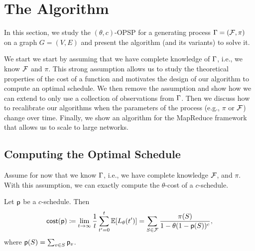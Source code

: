 \section{The \algoname Algorithm}\label{sec:method}
In this section, we study the $(\theta,c)$-OPSP  for a generating process
$\Gamma=(\mathcal{F},\pi)$ on a graph $G=(V,E)$ and present the algorithm \algoname (and
its variants) to solve it.

We start we start by assuming that we have complete knowledge of $\Gamma$, i.e.,
we know $\mathcal{F}$ and $\pi$. This strong assumption allows us to study the
theoretical properties of the cost of a function and motivates the design of
our algorithm \algoname to compute an optimal schedule. We then remove the
assumption and show how we can extend \algoname to only use a collection of
observations from $\Gamma$. Then we discuss how to recalibrate our algorithms when
the parameters of the process (e.g., $\pi$ or $\mathcal{F}$) change over time.
Finally, we show an algorithm for the MapReduce framework that allows us to
scale to large networks.

\subsection{Computing the Optimal Schedule}\label{sec:optimize}
Assume for now that we know $\Gamma$, i.e., we have complete knowledge $\mathcal{F}$,
and $\pi$. With this assumption, we can exactly compute the $\theta$-cost of a $c$-schedule.

\begin{lemma}\label{lem:explicit}
Let $\mathsf{p}$ be a $c$-schedule. Then
\begin{equation}\label{eq:explicit}
	\mathsf{cost}(\mathsf{p}) \coloneqq
	\lim_{t\rightarrow\infty}\frac{1}{t}\sum_{t'=0}^t\mathbb{E}[L_\theta(t')] =
	\sum_{S\in \mathcal{F}} \frac{\pi(S)}{1- \theta(1-\mathsf{p}(S))^c},
\end{equation}
where $\mathsf{p}(S) = \sum_{v\in S} \mathsf{p}_v$.
\end{lemma}

